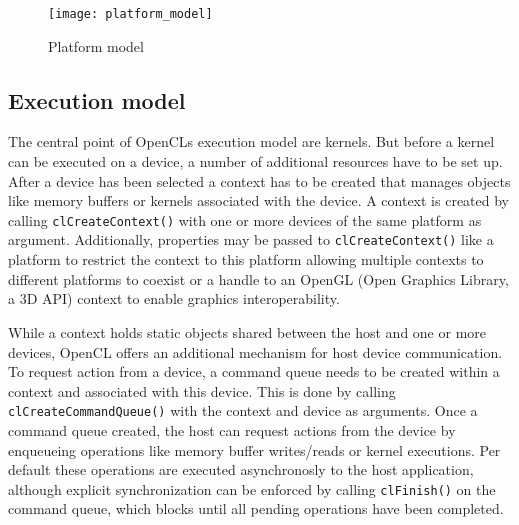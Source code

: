\begin{figure} 
\centering
\texttt{[image: platform\_model]}
\caption{Platform model}
\label{fig:platform_model}
\end{figure}

\subsection{Execution model}
\label{sec:execution_model}
The central point of OpenCLs execution model are kernels. But before a kernel can be executed on a device, a number of additional resources have to be set up.
After a device has been selected a context has to be created that manages objects like memory buffers or kernels associated with the device. A context is created by calling \lstinline!clCreateContext()! with one or more devices of the same platform as argument. Additionally, properties may be passed to \lstinline!clCreateContext()! like a platform to restrict the context to this platform allowing multiple contexts to different platforms to coexist or a handle to an OpenGL (Open Graphics Library, a 3D API) context to enable graphics interoperability. \cite[p.22]{opencl_book}

While a context holds static objects shared between the host and one or more devices, OpenCL offers an additional mechanism for host device communication. To request action from a device, a command queue needs to be created within a context and associated with this device. This is done by calling \lstinline!clCreateCommandQueue()! with the context and device as arguments. Once a command queue created, the host can request actions from the device by enqueueing operations like memory buffer writes/reads or kernel executions. Per default these operations are executed asynchronosly to the host application, although explicit synchronization can be enforced by calling \lstinline!clFinish()! on the command queue, which blocks until all pending operations have been completed. \cite[p.22, 23, 26]{opencl_book}

